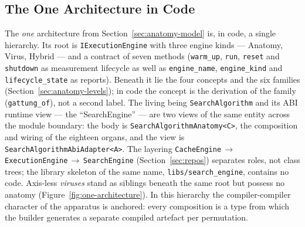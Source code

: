 \begin{nurkurz}
\subsection{The One Architecture in Code}\label{sec:impl-architecture}
The \emph{one} architecture from Section~\ref{sec:anatomy-model} is, in code, a single hierarchy. Its
root is \texttt{IExecutionEngine} with three engine kinds --- Anatomy, Virus, Hybrid --- and a contract
of seven methods (\texttt{warm\_up}, \texttt{run}, \texttt{reset} and \texttt{shutdown} as measurement
lifecycle as well as \texttt{engine\_name}, \texttt{engine\_kind} and \texttt{lifecycle\_state} as
reports). Beneath it lie the four concepts and the six families (Section~\ref{sec:anatomy-levels}); in
code the concept is the derivation of the family (\texttt{gattung\_of}), not a second label. The living
being \texttt{SearchAlgorithm} and its ABI runtime view --- the \enquote{SearchEngine} --- are two
views of the same entity across the module boundary: the body is \texttt{SearchAlgorithmAnatomy<C>},
the composition and wiring of the eighteen organs, and the view is
\texttt{SearchAlgorithmAbiAdapter<A>}. The layering
\texttt{CacheEngine}\,$\to$\,\texttt{ExecutionEngine}\,$\to$\,\texttt{SearchEngine}
(Section~\ref{sec:repos}) separates roles, not class trees; the library skeleton of the same name,
\texttt{libs/search\_engine}, contains no code. Axis-less \emph{viruses} stand as siblings beneath the
same root but possess no anatomy (Figure~\ref{fig:one-architecture}). In this hierarchy the
compiler-compiler character of the apparatus is anchored: every composition is a type from which the
builder generates a separate compiled artefact per permutation.
\end{nurkurz}

